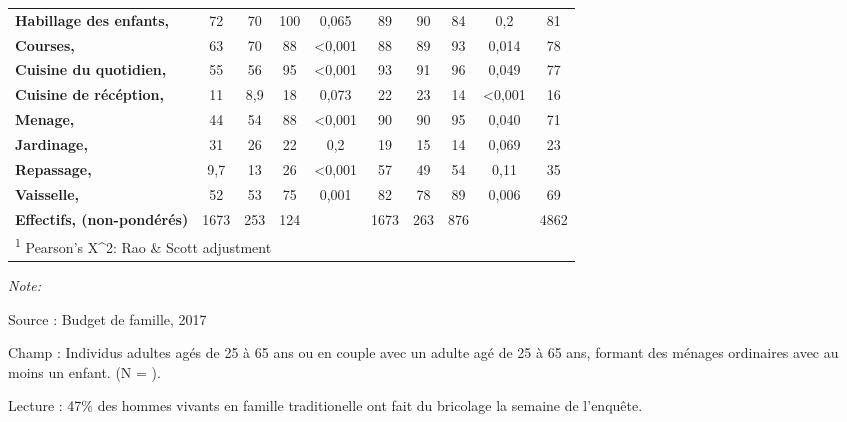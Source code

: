 \documentclass[
  12pt,
]{book}
\begin{document}
\begin{table}[!h]
{\begin{threeparttable}
\begin{tabular}[t]{lccccccccc}
\hspace{1em}\textbf{Habillage des enfants, } & 72 & 70 & 100 & 0,065 & 89 & 90 & 84 & 0,2 & 81\\
\hspace{1em}\textbf{Courses, } & 63 & 70 & 88 & <0,001 & 88 & 89 & 93 & 0,014 & 78\\
\hspace{1em}\textbf{Cuisine du quotidien, } & 55 & 56 & 95 & <0,001 & 93 & 91 & 96 & 0,049 & 77\\
\hspace{1em}\textbf{Cuisine de récéption, } & 11 & 8,9 & 18 & 0,073 & 22 & 23 & 14 & <0,001 & 16\\
\hspace{1em}\textbf{Menage, } & 44 & 54 & 88 & <0,001 & 90 & 90 & 95 & 0,040 & 71\\
\hspace{1em}\textbf{Jardinage, } & 31 & 26 & 22 & 0,2 & 19 & 15 & 14 & 0,069 & 23\\
\hspace{1em}\textbf{Repassage, } & 9,7 & 13 & 26 & <0,001 & 57 & 49 & 54 & 0,11 & 35\\
\hspace{1em}\textbf{Vaisselle, } & 52 & 53 & 75 & 0,001 & 82 & 78 & 89 & 0,006 & 69\\
\textbf{Effectifs, (non-pondérés)} & 1673 & 253 & 124 &  & 1673 & 263 & 876 &  & 4862\\
\bottomrule
\multicolumn{10}{l}{\rule{0pt}{1em}\textsuperscript{1} Pearson's X\textasciicircum{}2: Rao \& Scott adjustment}\\
\end{tabular}
\begin{tablenotes}
\item \textit{Note: } 
\item Source : Budget de famille, 2017
\item Champ : Individus adultes agés de 25 à 65 ans ou en couple avec un adulte agé de 25 à 65 ans, formant des ménages ordinaires avec au moins un enfant. (N = ).
\item Lecture : 47\% des hommes vivants en famille traditionelle ont fait du bricolage la semaine de l'enquête.
\end{tablenotes}
\end{threeparttable}}
\end{table}
\end{document}
